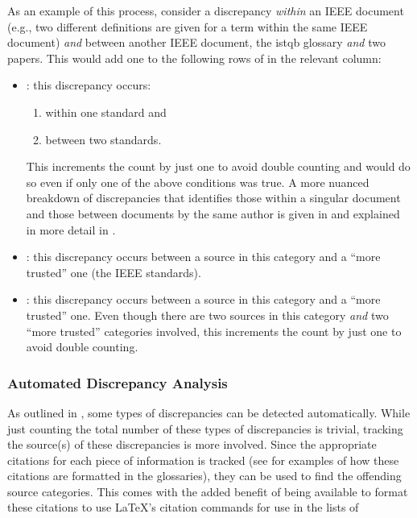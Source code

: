 \label{discrep-analysis-example}
As an example of this process, consider a discrepancy \emph{within} an IEEE
document (e.g., two different definitions are given for a term within the same
IEEE document) \emph{and} between another IEEE document, the \acs{istqb}
glossary \emph{and} two papers. This would add one to the
following rows of  in the relevant column:

\begin{itemize}
    \item \textbf{\stds{}}: this discrepancy occurs:
          \begin{enumerate}
              \item within one standard and
              \item between two standards.
          \end{enumerate}
          This increments the count by just one to avoid double counting and
          would do so even if only one of the above conditions was true. A more
          nuanced breakdown of discrepancies that identifies those within a
          singular document and those between documents by the same author is
          given in  and explained in more detail in
          .
    \item \textbf{\metas{}}: this discrepancy occurs between a
          source in this category and a ``more trusted'' one
          (the IEEE standards).
    \item \textbf{\papers{}}: this discrepancy occurs between a
          source in this category and a ``more trusted'' one. Even though there
          are two sources in this category \emph{and} two ``more trusted''
          categories involved, this increments the count by just one to avoid
          double counting.
\end{itemize}

\subsubsection{Automated Discrepancy Analysis}
\label{auto-discrep-analysis}

As outlined in , some types of discrepancies can be detected
automatically. While just counting the total number of these types of
discrepancies is trivial, tracking the source(s) of these discrepancies is more
involved. Since the appropriate citations for each piece of information is
tracked (see  for examples of
how these citations are formatted in the glossaries), they can be used to find
the offending source categories. This comes with the added benefit of being
available to format these citations to use \LaTeX{}'s citation commands for use
in the lists of \autoDiscreps[.]{}

